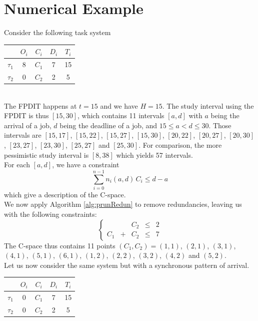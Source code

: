\documentclass[times, 10pt,twocolumn, a4paper]{article}
\begin{document}
\section{Numerical Example}

Consider the following task system

		\begin{center}
		\begin{tabular}{|r|c|c|c|c|}
		 \hline
		  & $O_i$ & $C_i$ & $D_i$ & $T_i$ \\
		 \hline
		 $\tau_1$ & 8 & $C_1$ & 7 & 15\\
		 \hline
		 $\tau_2$ & 0 & $C_2$ & 2 & 5\\
		 \hline
		\end{tabular}
		\end{center}
		~\\

The FPDIT happens at $t=15$ and we have $H = 15$. The study interval using the FPDIT is thus $[15, 30]$, which contains 11 intervals $[a,d]$ with $a$ being the arrival of a job, $d$ being the deadline of a job, and $15 \leqslant a < d \leqslant 30$. Those intervals are
$[15, 17]$, $[15, 22]$, $[15, 27]$, $[15, 30]$, $[20, 22]$, $[20, 27]$, $[20, 30]$, $[23, 27]$, $[23, 30]$, $[25, 27]$ and $[25, 30]$. For comparison, the more pessimistic study interval is $[8, 38]$ which yields 57 intervals.\\

For each $[a, d]$, we have a constraint $$\sum_{i=0}^{n-1} n_i(a, d) \, C_i \leqslant d - a$$ which give a description of the C-space.\\

We now apply Algorithm \ref{alg:prunRedun} to remove redundancies, leaving us with the following constraints:
$$
\left\{
	\begin{array}{ccccc}
		& & C_2 & \leqslant & 2 \\
		C_1 & + & C_2 & \leqslant & 7
	\end{array}
\right.
$$
The C-space thus contains 11 points $(C_1, C_2) = (1, 1)$, $(2, 1)$, $(3, 1)$, $(4, 1)$, $(5, 1)$, $(6, 1)$, $(1, 2)$, $(2, 2)$, $(3, 2)$, $(4, 2)$ and $(5, 2)$.\\

Let us now consider the same system but with a synchronous pattern of arrival.

		\begin{center}
		\begin{tabular}{|r|c|c|c|c|}
		 \hline
		  & $O_i$ & $C_i$ & $D_i$ & $T_i$ \\
		 \hline
		 $\tau_1$ & 0 & $C_1$ & 7 & 15\\
		 \hline
		 $\tau_2$ & 0 & $C_2$ & 2 & 5\\
		 \hline
		\end{tabular}
		\end{center}
		~\\
\end{document}
